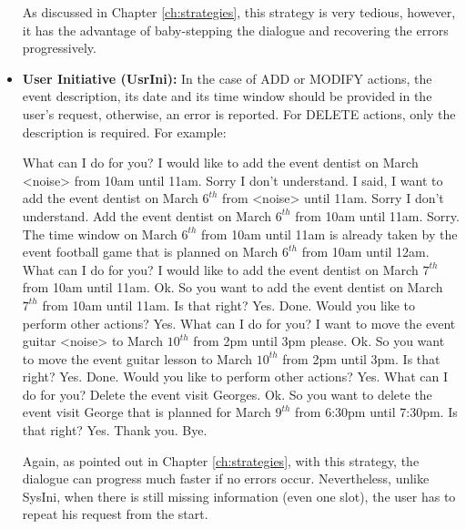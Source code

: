 \begin{itemize}
              As discussed in Chapter \ref{ch:strategies}, this strategy is very tedious, however, it has the advantage of baby-stepping the dialogue and recovering the errors progressively.

          \item \textbf{User Initiative (UsrIni):} In the case of ADD or MODIFY actions, the event description, its date and its time window should be provided in the user's request, otherwise, an error is reported. For DELETE actions, only the description is required. For example:

						\begin{dialogue}
								 What can I do for you?
								 I would like to add the event dentist on March <noise> from 10am until 11am.
								 Sorry I don't understand.
								 I said, I want to add the event dentist on March $6^{th}$ from <noise> until 11am.
								 Sorry I don't understand.
								 Add the event dentist on March $6^{th}$ from 10am until 11am.
								 Sorry. The time window on March $6^{th}$ from 10am until 11am is already taken by the event football game that is planned on March $6^{th}$ from 10am until 12am. What can I do for you?
								 I would like to add the event dentist on March $7^{th}$ from 10am until 11am.
								 Ok. So you want to add the event dentist on March $7^{th}$ from 10am until 11am. Is that right?
								 Yes.
								 Done. Would you like to perform other actions?
								 Yes.
								 What can I do for you?
								 I want to move the event guitar <noise> to March $10^{th}$ from 2pm until 3pm please.
								 Ok. So you want to move the event guitar lesson to March $10^{th}$ from 2pm until 3pm. Is that right?
								 Yes.
								 Done. Would you like to perform other actions?
								 Yes.
								 What can I do for you?
								 Delete the event visit Georges.
								 Ok. So you want to delete the event visit George that is planned for March $9^{th}$ from 6:30pm until 7:30pm. Is that right?
								 Yes.
								 Thank you. Bye.
						\end{dialogue}

              Again, as pointed out in Chapter \ref{ch:strategies}, with this strategy, the dialogue can progress much faster if no errors occur. Nevertheless, unlike SysIni, when there is still missing information (even one slot), the user has to repeat his request from the start.


\end{itemize}
